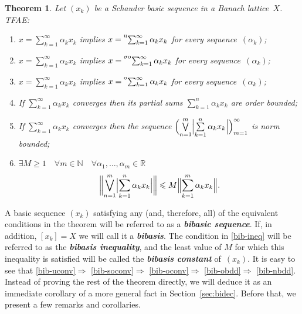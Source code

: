 \documentclass[12pt]{amsart}
\theoremstyle{plain}
\newtheorem{theorem}{Theorem}[section]
\theoremstyle{definition}
\newcommand{\Bigabs}[1]{\Bigl\lvert#1\Bigr\rvert}
\newcommand{\Bignorm}[1]{\Bigl\lVert#1\Bigr\rVert}
\newcommand{\biggnorm}[1]{\biggl\lVert#1\biggr\rVert}
\newcommand{\term}[1]{{\textit{\textbf{#1}}}}   %
\newcommand{\s}{\sum_{k=1}^\infty}
\newcommand{\tos}{\prescript{{\rm o}}{}{\sum_{k=1}^\infty\,}}
\newcommand{\tsos}{\prescript{{\sigma\rm o}}{}{\sum_{k=1}^\infty\,}}
\newcommand{\tus}{\prescript{{\rm u}}{}{\sum_{k=1}^\infty\,}}
\renewcommand{\le}{\leqslant}
\renewcommand{\ge}{\geqslant}
\begin{document}
\begin{theorem}\label{bib}
  Let $(x_k)$ be a Schauder basic sequence in a Banach
  lattice~$X$. TFAE:
  \begin{enumerate}
  \item\label{bib-uconv} $x=\s\alpha_kx_k$ implies
    $x=\tus\alpha_kx_k$ for every sequence~$(\alpha_k)$;
  \item\label{bib-soconv} $x=\s\alpha_kx_k$ implies
    $x=\tsos\alpha_kx_k$ for every sequence~$(\alpha_k)$;
  \item\label{bib-oconv} $x=\s\alpha_kx_k$ implies
    $x=\tos\alpha_kx_k$ for every sequence~$(\alpha_k)$;
  \item\label{bib-obdd} If $\sum\limits_{k=1}^\infty\alpha_kx_k$
    converges then its partial sums $\sum\limits_{k=1}^n\alpha_kx_k$
    are order bounded;
  \item\label{bib-nbdd} If $\sum\limits_{k=1}^\infty\alpha_kx_k$
    converges then the sequence
    \begin{math}
     \Bigl(\bigvee\limits_{n=1}^m\Bigabs{\sum\limits_{k=1}^n\alpha_kx_k}
     \Bigr)_{m=1}^\infty
   \end{math}
    is norm bounded;
  \item\label{bib-ineq}
    \begin{math}
      \exists M\ge 1\quad\forall m\in\mathbb
      N\quad\forall\alpha_1,\dots,\alpha_m\in\mathbb R
    \end{math}
    \begin{displaymath}
      \biggnorm{\bigvee\limits_{n=1}^m\Bigabs{\sum\limits_{k=1}^n\alpha_kx_k}}
      \le M\Bignorm{\sum_{k=1}^m\alpha_kx_k}.
    \end{displaymath}
  \end{enumerate}
\end{theorem}

A basic sequence $(x_k)$ satisfying any (and, therefore, all) of the
equivalent conditions in the theorem will be referred to as a
\term{bibasic sequence}. If, in addition, $[x_k]=X$ we will call it a
\term{bibasis}. The condition in \eqref{bib-ineq} will be referred to
as the \term{bibasis inequality}, and the least value of $M$ for which
this inequality is satisfied will be called the \term{bibasis
  constant} of~$(x_k)$.  It is easy to see that
\eqref{bib-uconv}$\Rightarrow$%
\eqref{bib-soconv}$\Rightarrow$%
\eqref{bib-oconv}$\Rightarrow$%
\eqref{bib-obdd}$\Rightarrow$%
\eqref{bib-nbdd}.
Instead of proving the rest of the theorem
directly, we will deduce it as an immediate corollary of a more
general fact in Section~\ref{sec:bidec}. Before that, we present a few
remarks and corollaries.
\end{document}
